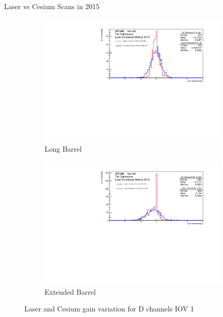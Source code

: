 \documentclass{beamer}
\begin{document}
\begin{frame}{Laser vs Cesium Scans in 2015}
\begin{figure}[H]
\centering
\begin{subfigure} [t] {0.49\textwidth}
\includegraphics[width=\textwidth]{cs1d_d_lb_iov1.pdf}
\caption{Long Barrel}
\end{subfigure}
\begin{subfigure} [t] {0.49\textwidth}
\includegraphics[width=\textwidth]{cs1d_d_eb_iov1.pdf}
\caption{Extended Barrel}
\end{subfigure}
\caption{Laser and Cesium gain variation for D channels IOV 1}
\end{figure}
\end{frame}
\end{document}
